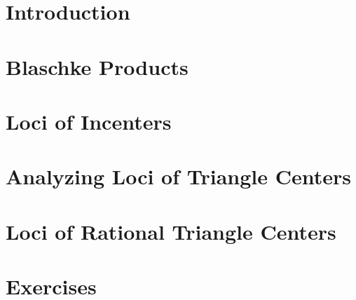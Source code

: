 \section{Introduction}


\section{Blaschke Products}
\label{sec:04-blaschke}


\section{Loci of Incenters}
\label{sec:04-proof_theorem}


\section{Analyzing Loci of Triangle Centers}
\label{sec:04-loci}


\section{Loci of Rational Triangle Centers}
\label{sec:04-rational-trilinears}


\section{Exercises}
\label{sec:04-exercises}

